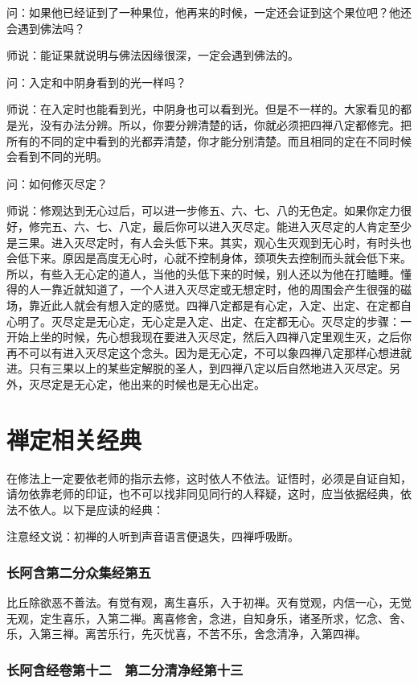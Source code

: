 \documentclass{book}
\begin{document}
问：如果他已经证到了一种果位，他再来的时候，一定还会证到这个果位吧？他还会遇到佛法吗？

师说：能证果就说明与佛法因缘很深，一定会遇到佛法的。

问：入定和中阴身看到的光一样吗？

师说：在入定时也能看到光，中阴身也可以看到光。但是不一样的。大家看见的都是光，没有办法分辨。所以，你要分辨清楚的话，你就必须把四禅八定都修完。把所有的不同的定中看到的光都弄清楚，你才能分别清楚。而且相同的定在不同时候会看到不同的光明。

问：如何修灭尽定？

师说：修观达到无心过后，可以进一步修五、六、七、八的无色定。如果你定力很好，修完五、六、七、八定，最后你可以进入灭尽定。能进入灭尽定的人肯定至少是三果。进入灭尽定时，有人会头低下来。其实，观心生灭观到无心时，有时头也会低下来。原因是高度无心时，心就不控制身体，颈项失去控制而头就会低下来。所以，有些入无心定的道人，当他的头低下来的时候，别人还以为他在打瞌睡。懂得的人一靠近就知道了，一个人进入灭尽定或无想定时，他的周围会产生很强的磁场，靠近此人就会有想入定的感觉。四禅八定都是有心定，入定、出定、在定都自心明了。灭尽定是无心定，无心定是入定、出定、在定都无心。灭尽定的步骤：一开始上坐的时候，先心想我现在要进入灭尽定，然后入四禅八定里观生灭，之后你再不可以有进入灭尽定这个念头。因为是无心定，不可以象四禅八定那样心想进就进。只有三果以上的某些定解脱的圣人，到四禅八定以后自然地进入灭尽定。另外，灭尽定是无心定，他出来的时候也是无心出定。

\appendix

\chapter{禅定相关经典}

在修法上一定要依老师的指示去修，这时依人不依法。证悟时，必须是自证自知，请勿依靠老师的印证，也不可以找非同见同行的人释疑，这时，应当依据经典，依法不依人。以下是应读的经典：

注意经文说：初禅的人听到声音语言便退失，四禅呼吸断。

\subsection{长阿含第二分众集经第五}

比丘除欲恶不善法。有觉有观，离生喜乐，入于初禅。灭有觉观，内信一心，无觉无观，定生喜乐，入第二禅。离喜修舍，念进，自知身乐，诸圣所求，忆念、舍、乐，入第三禅。离苦乐行，先灭忧喜，不苦不乐，舍念清净，入第四禅。

\subsection{长阿含经卷第十二　第二分清净经第十三}
\end{document}
